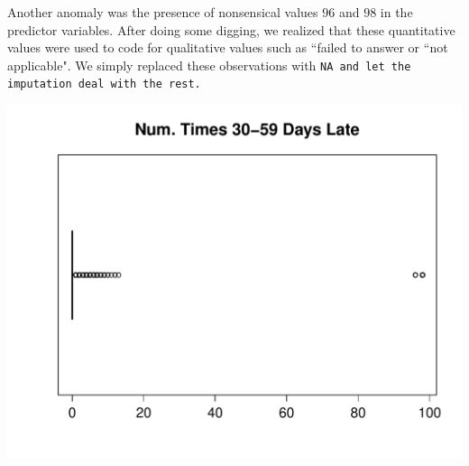 \documentclass[11pt, oneside]{article}   	%
\begin{document}
	
	Another anomaly was the presence of nonsensical values $96$ and $98$ 
	in the predictor variables. After doing some digging, we realized that 
	these quantitative values were used to code for qualitative values such as 
	``failed to answer or ``not applicable". We simply replaced these observations with
	\tt NA\rm~and let the imputation deal with the rest.
	\begin{center}
	\includegraphics[scale=0.4]{96}
	\end{center}
	
	
\end{document}
